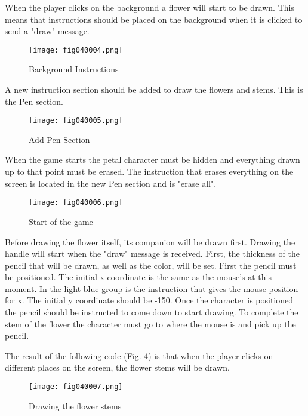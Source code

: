 When the player clicks on the background a flower will start to be drawn. This means that instructions should be placed on the background when it is clicked to send a "draw" message.

\begin{figure}[H]
   \centering
   \texttt{[image: fig040004.png]}
   \caption{Background Instructions}
\label{fig040004}
\end{figure}

A new instruction section should be added to draw the flowers and stems. This is the Pen section.

\begin{figure}[H]
   \centering
   \texttt{[image: fig040005.png]}
   \caption{Add Pen Section}
\label{fig040005}
\end{figure}

When the game starts the petal character must be hidden and everything drawn up to that point must be erased. The instruction that erases everything on the screen is located in the new Pen section and is "erase all".

\begin{figure}[H]
   \centering
   \texttt{[image: fig040006.png]}
   \caption{Start of the game}
\label{fig040006}
\end{figure}

Before drawing the flower itself, its companion will be drawn first. Drawing the handle will start when the "draw" message is received. First, the thickness of the pencil that will be drawn, as well as the color, will be set. First the pencil must be positioned. The initial x coordinate is the same as the mouse's at this moment. In the light blue group is the instruction that gives the mouse position for x. The initial y coordinate should be -150. Once the character is positioned the pencil should be instructed to come down to start drawing. To complete the stem of the flower the character must go to where the mouse is and pick up the pencil.

The result of the following code (Fig. \ref{fig040007}) is that when the player clicks on different places on the screen, the flower stems will be drawn.

\begin{figure}[H]
   \centering
   \texttt{[image: fig040007.png]}
   \caption{Drawing the flower stems}
\label{fig040007}
\end{figure}

